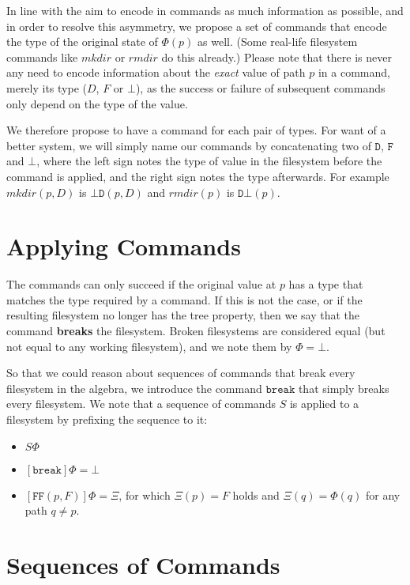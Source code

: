 \documentclass[12pt]{article}
\newcommand{\empt}{\bot}
\newcommand{\FS}{\Phi} %
\newcommand{\GS}{\Xi} %
\newcommand{\cbrk}{\mathtt{break}}
\newcommand{\fscommand}[2]{{#1#2}}
\newcommand{\fsregcommandchar}[1]{\mathtt{#1}}
\newcommand{\fsregcommand}[2]{\fscommand{\fsregcommandchar{#1}}{\fsregcommandchar{#2}}}
\newcommand{\cbd}{\fsregcommand{\empt}{D}}
\newcommand{\cff}{\fsregcommand{F}{F}}
\newcommand{\cdb}{\fsregcommand{D}{\empt}}
\theoremstyle{definition}
\begin{document}
In line with the aim to encode in commands as much information as possible,
and in order to resolve this asymmetry, we propose a set of commands that encode
the type of the original state of $\FS(p)$ as well.
(Some real-life filesystem commands like $mkdir$ or $rmdir$ do this already.)
Please note that there is never any need to encode information about the
{\it exact} value of path $p$ in a command, merely its type ($D$, $F$ or $\empt$),
as the success or failure of subsequent commands only depend on the type of the value.

We therefore propose to have a command for each pair of types.
For want of a better system, we will simply name our commands by concatenating
two of $\fsregcommandchar{D}$, $\fsregcommandchar{F}$ and $\fsregcommandchar{\empt}$, 
where the left sign notes the type of value
in the filesystem before the command is applied, and the right sign notes the type
afterwards. For example $mkdir(p,D)$ is $\cbd(p,D)$ and $rmdir(p)$ is $\cdb(p)$.


\section{Applying Commands}

The commands can only succeed if the original value at $p$ has a type that matches
the type required by a command. If this is not the case, or if the resulting
filesystem no longer has the tree property, then we say that the command
\textbf{breaks} the filesystem. Broken filesystems are considered equal
(but not equal to any working filesystem), and we note them by $\FS=\empt$.

So that we could reason about sequences of commands that break every filesystem
in the algebra, we introduce the command $\cbrk$ that simply breaks every filesystem.
We note that a sequence of commands $S$ is applied to a filesystem
by prefixing the sequence to it:
\begin{itemize}
\item $S\FS$
\item $[\cbrk]\FS=\empt$
\item $[\cff(p,F)]\FS = \GS$, for which $\GS(p)=F$ holds
and $\GS(q)=\FS(q)$ for any path $q\neq p$.
\end{itemize}

\section{Sequences of Commands}
\end{document}
